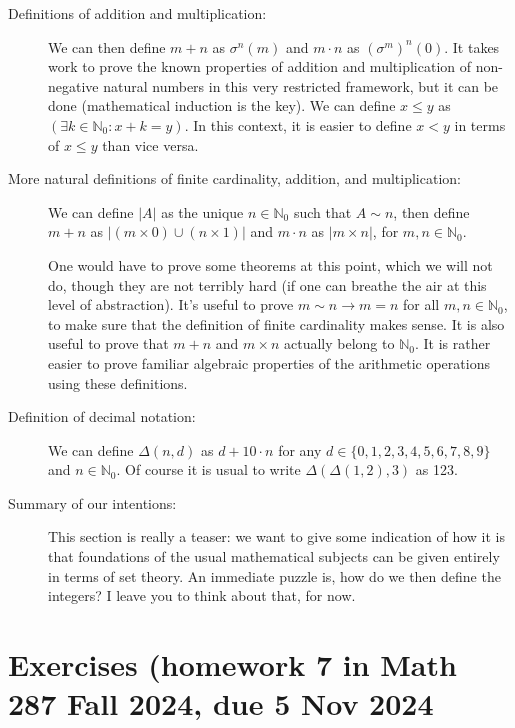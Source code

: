 \documentclass[12pt]{article}
\begin{document}
\begin{description}
\begin{description}
\end{description}

\item[Definitions of addition and multiplication:]  We can then define $m+n$ as $\sigma^n(m)$ and $m \cdot n$ as $(\sigma^m)^n(0)$.  It takes work to prove the known properties of addition and multiplication of non-negative natural numbers in this very restricted framework, but it can be done (mathematical induction is the key).  We can define $x \leq y$ as $(\exists k \in \mathbb N_0:x+k=y)$.  In this context, it is easier to define $x <y$ in terms of $x \leq y$ than vice versa.

\item[More natural definitions of finite cardinality, addition, and multiplication:]  We can define $|A|$ as the unique $n \in \mathbb N_0$ such that $A \sim n$, then define $m+n$ as $|(m \times 0) \cup (n \times 1)|$ and $m \cdot n$ as $|m \times n|$, for $m,n \in \mathbb N_0$.

One would have to prove some theorems at this point, which we will not do, though they are not terribly hard (if one can breathe the air at this level of abstraction).  It's useful to prove $m \sim n \rightarrow m=n$ for all $m,n \in \mathbb N_0$, to make sure that the definition of finite cardinality makes sense.  It is also useful to prove that $m+n$ and $m \times n$ actually belong to $\mathbb N_0$.  It is rather easier to prove familiar algebraic properties of the arithmetic operations using these definitions.

\item[Definition of decimal notation:]  We can define $\Delta(n,d)$ as $d+10\cdot n$ for any $d \in \{0,1,2,3,4,5,6,7,8,9\}$ and
$n \in \mathbb N_0$.  Of course it is usual to write $\Delta(\Delta(1,2),3)$ as 123.

\item[Summary of our intentions:]  This section is really a teaser:  we want to give some indication of how it is that foundations of the usual mathematical subjects can be given entirely in terms of set theory.  An immediate puzzle is, how do we then define the integers?  I leave you to think about that, for now.


\end{description}

\section{Exercises (homework 7 in Math 287 Fall 2024, due 5 Nov 2024}
\end{document}
